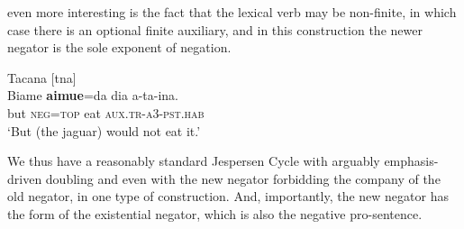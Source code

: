 ﻿\documentclass[output=paper]{langsci/langscibook}
\begin{document}
even more interesting is the fact that the lexical verb may be non-finite,
in which case there is an optional finite auxiliary, and in this
construction the newer negator is the sole exponent of negation.
%
\begin{exe}\ex\label{ex:int-tacana-jaguar}
 Tacana [tna]   \\
    \gll    Biame    \textbf{aimue}=da  dia  {\op}a-ta-ina{\cp}.  \\
    but    \textsc{neg=top}  eat  \textsc{aux.tr-a3-pst.hab}  \\
    \glt `But (the jaguar) would not eat it.'
    \end{exe}
%
We thus have a reasonably standard Jespersen Cycle with arguably
emphasis-driven doubling and even with the new negator forbidding the
company of the old negator, in one type of construction. And, importantly,
the new negator has the form of the existential negator, which is also the
negative pro-sentence.
\end{document}
